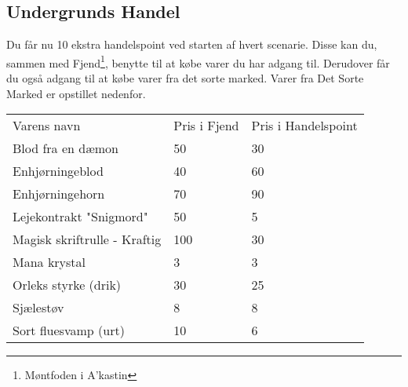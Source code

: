 \subsection*{Undergrunds Handel}
Du får nu 10 ekstra handelspoint ved starten af hvert scenarie. Disse kan du, sammen med Fjend\footnote{Møntfoden i A'kastin}, benytte til at købe varer du har adgang til. Derudover får du også adgang til at købe varer fra det sorte marked. Varer fra Det Sorte Marked er opstillet nedenfor.
\begin{table}[H]
    \centering
    \begin{tabular}{|p{}|p{}|p{}|}
    \hline
    \rowcolor{cerulean!80}
    \multicolumn{3}{c}{Det Sorte Marked}\\
    \hline
    \rowcolor{cerulean!40}
         Varens navn & Pris i Fjend & Pris i Handelspoint \\\hline
         Blod fra en dæmon & 50 & 30\\\hline
         Enhjørningeblod & 40 & 60 \\\hline
         Enhjørningehorn & 70 & 90 \\\hline
         Lejekontrakt "Snigmord" & 50 & 5\\\hline
         Magisk skriftrulle - Kraftig& 100 & 30\\\hline
         Mana krystal & 3 & 3\\\hline
         Orleks styrke (drik) & 30 & 25\\\hline
         Sjælestøv & 8 & 8\\\hline
         Sort fluesvamp (urt) & 10 & 6\\\hline
    \end{tabular}
    \end{table}
